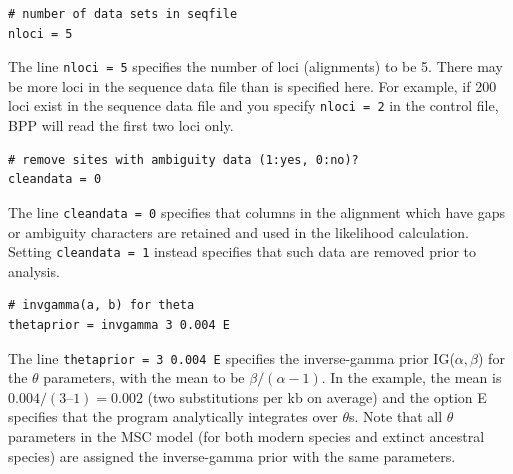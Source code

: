 \documentclass{book}
\numberwithin{equation}{section} \renewcommand{\baselinestretch}{0.55}
\begin{document}
\begin{verbatim}
# number of data sets in seqfile
nloci = 5  
\end{verbatim}
The line \texttt{nloci = 5} specifies the number of loci (alignments)
to be 5.  There may be more loci in the sequence data file than is
specified here. For example, if 200 loci exist in the sequence data
file and you specify \texttt{nloci = 2} in the control file,
\textsc{BPP} will read the first two loci only.

\begin{verbatim}
# remove sites with ambiguity data (1:yes, 0:no)?
cleandata = 0    
\end{verbatim}
The line \texttt{cleandata = 0} specifies that columns in the
alignment which have gaps or ambiguity characters are retained and
used in the likelihood calculation. Setting \texttt{cleandata = 1}
instead specifies that such data are removed prior to analysis.
\begin{verbatim}
# invgamma(a, b) for theta
thetaprior = invgamma 3 0.004 E  
\end{verbatim}
The line \texttt{thetaprior = 3 0.004 E} specifies the inverse-gamma
prior IG($\alpha, \beta$) for the $\theta$ parameters, with the mean
to be $\beta/(\alpha-1)$.  In the example, the mean is
$0.004/(3 – 1) = 0.002$ (two substitutions per kb on average) and the
option E specifies that the program analytically integrates over
$\theta$s.  Note that all $\theta$ parameters in the MSC model (for
both modern species and extinct ancestral species) are assigned the
inverse-gamma prior with the same parameters.
\end{document}

